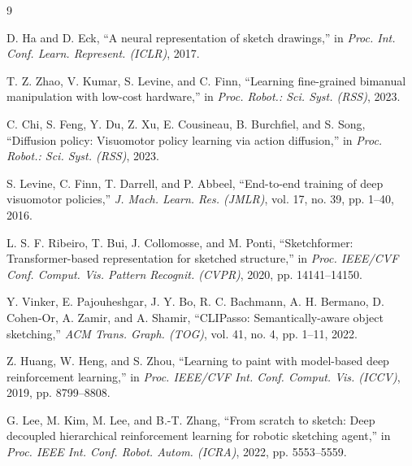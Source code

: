 \documentclass[10pt,twocolumn,letterpaper]{article}
\begin{document}
\begin{thebibliography}{9}

D. Ha and D. Eck, ``A neural representation of sketch drawings,'' in \emph{Proc. Int. Conf. Learn. Represent. (ICLR)}, 2017.

T. Z. Zhao, V. Kumar, S. Levine, and C. Finn, ``Learning fine-grained bimanual manipulation with low-cost hardware,'' in \emph{Proc. Robot.: Sci. Syst. (RSS)}, 2023.

C. Chi, S. Feng, Y. Du, Z. Xu, E. Cousineau, B. Burchfiel, and S. Song, ``Diffusion policy: Visuomotor policy learning via action diffusion,'' in \emph{Proc. Robot.: Sci. Syst. (RSS)}, 2023.

S. Levine, C. Finn, T. Darrell, and P. Abbeel, ``End-to-end training of deep visuomotor policies,'' \emph{J. Mach. Learn. Res. (JMLR)}, vol. 17, no. 39, pp. 1--40, 2016.

L. S. F. Ribeiro, T. Bui, J. Collomosse, and M. Ponti, ``Sketchformer: Transformer-based representation for sketched structure,'' in \emph{Proc. IEEE/CVF Conf. Comput. Vis. Pattern Recognit. (CVPR)}, 2020, pp. 14141--14150.

Y. Vinker, E. Pajouheshgar, J. Y. Bo, R. C. Bachmann, A. H. Bermano, D. Cohen-Or, A. Zamir, and A. Shamir, ``CLIPasso: Semantically-aware object sketching,'' \emph{ACM Trans. Graph. (TOG)}, vol. 41, no. 4, pp. 1--11, 2022.

Z. Huang, W. Heng, and S. Zhou, ``Learning to paint with model-based deep reinforcement learning,'' in \emph{Proc. IEEE/CVF Int. Conf. Comput. Vis. (ICCV)}, 2019, pp. 8799--8808.

G. Lee, M. Kim, M. Lee, and B.-T. Zhang, ``From scratch to sketch: Deep decoupled hierarchical reinforcement learning for robotic sketching agent,'' in \emph{Proc. IEEE Int. Conf. Robot. Autom. (ICRA)}, 2022, pp. 5553--5559.

\end{thebibliography}
\end{document}
